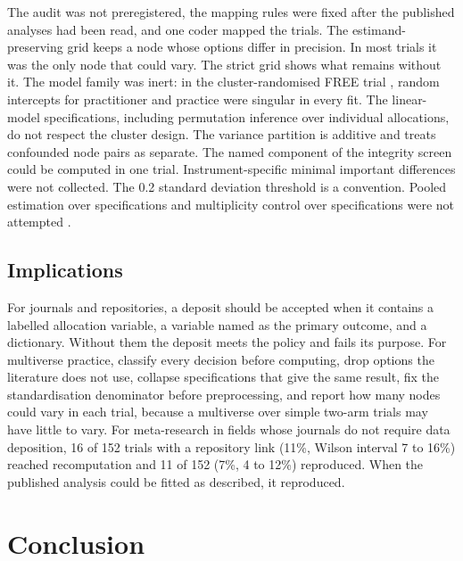 The audit was not preregistered, the mapping rules were fixed after the published analyses had been read, and one coder mapped the trials. The estimand-preserving grid keeps a node whose options differ in precision. In most trials it was the only node that could vary. The strict grid shows what remains without it. The model family was inert: in the cluster-randomised FREE trial \cite{Darlow_2019}, random intercepts for practitioner and practice were singular in every fit. The linear-model specifications, including permutation inference over individual allocations, do not respect the cluster design. The variance partition is additive and treats confounded node pairs as separate. The named component of the integrity screen could be computed in one trial. Instrument-specific minimal important differences were not collected. The 0.2 standard deviation threshold is a convention. Pooled estimation over specifications and multiplicity control over specifications were not attempted \cite{Bartos_2025_arXiv,Mandl_2024}.

\subsection{Implications}\label{implications}

For journals and repositories, a deposit should be accepted when it contains a labelled allocation variable, a variable named as the primary outcome, and a dictionary. Without them the deposit meets the policy and fails its purpose. For multiverse practice, classify every decision before computing, drop options the literature does not use, collapse specifications that give the same result, fix the standardisation denominator before preprocessing, and report how many nodes could vary in each trial, because a multiverse over simple two-arm trials may have little to vary. For meta-research in fields whose journals do not require data deposition, 16 of 152 trials with a repository link (11\%, Wilson interval 7 to 16\%) reached recomputation and 11 of 152 (7\%, 4 to 12\%) reproduced. When the published analysis could be fitted as described, it reproduced.

\section{Conclusion}\label{conclusion}

